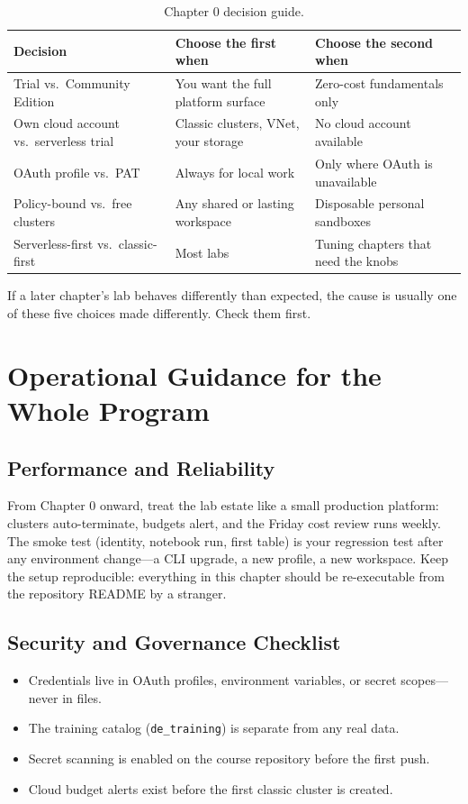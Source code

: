 \begin{table}[H]
\centering
\small
\begin{tabular}{@{}p{3.4cm}p{4.4cm}p{4.6cm}@{}}
\toprule
\textbf{Decision} & \textbf{Choose the first when} & \textbf{Choose the second when} \\
\midrule
Trial vs.\ Community Edition & You want the full platform surface & Zero-cost fundamentals only \\
Own cloud account vs.\ serverless trial & Classic clusters, VNet, your storage & No cloud account available \\
OAuth profile vs.\ PAT & Always for local work & Only where OAuth is unavailable \\
Policy-bound vs.\ free clusters & Any shared or lasting workspace & Disposable personal sandboxes \\
Serverless-first vs.\ classic-first & Most labs & Tuning chapters that need the knobs \\
\bottomrule
\end{tabular}
\caption{Chapter 0 decision guide.}
\label{tab:ch0-decisions}
\end{table}

If a later chapter's lab behaves differently than expected, the cause is usually one of these five choices made differently. Check them first.

\section{Operational Guidance for the Whole Program}
%
\subsection{Performance and Reliability}
From Chapter 0 onward, treat the lab estate like a small production platform: clusters auto-terminate, budgets alert, and the Friday cost review runs weekly. The smoke test (identity, notebook run, first table) is your regression test after any environment change---a CLI upgrade, a new profile, a new workspace. Keep the setup reproducible: everything in this chapter should be re-executable from the repository README by a stranger.

\subsection{Security and Governance Checklist}
\begin{itemize}
    \item Credentials live in OAuth profiles, environment variables, or secret scopes---never in files.
    \item The training catalog (\texttt{de\_training}) is separate from any real data.
    \item Secret scanning is enabled on the course repository before the first push.
    \item Cloud budget alerts exist before the first classic cluster is created.
\end{itemize}

